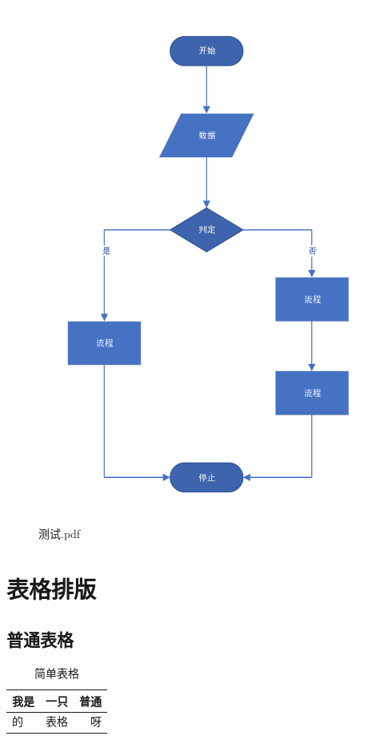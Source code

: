 \documentclass[fontset=windows]{ctexart}
\numberwithin{figure}{section}
\begin{document}
\begin{figure}[H]
\begin{minipage}[c]{0.5\textwidth}
		\includegraphics[width=1\textwidth]{测试.pdf}
		\caption{测试.pdf}
	\end{minipage}
\end{figure}

\section{表格排版}
\subsection{普通表格}
\begin{table}[H]
	\centering
	\caption{简单表格}
	\label{tab:1}
	\begin{tabular}{|l|c|r|}
	  \hline
	  我是 & 一只 & 普通 \\
	  \hline
	  的   & 表格 & 呀   \\
	  \hline
	\end{tabular}
  \end{table}
\end{document}
